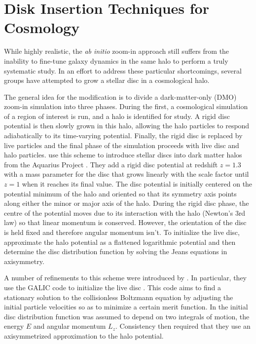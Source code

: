 \section{Disk Insertion Techniques for Cosmology}

While highly realistic, the \textit{ab initio} zoom-in approach still suffers from the inability to fine-tune galaxy dynamics in the same halo to perform a truly systematic study. In an effort to address these particular shortcomings, several groups have attempted to grow a stellar disc in a cosmological halo.  


The general idea for the modification is to divide a dark-matter-only (DMO) zoom-in simulation into three phases.  During the first, a cosmological simulation of a region of interest is run, and a halo is identified for study.  A rigid disc potential is then slowly grown in this halo, allowing the halo particles to respond adiabatically to its time-varying potential.  Finally, the rigid disc is replaced by live particles and the final phase of the simulation proceeds with live disc and halo particles.  \citet{debuhr_2012} use this scheme to introduce stellar discs into dark matter halos from the Aquarius Project \citep{springel2008}.  They add a rigid disc potential at redshift $z=1.3$ with a mass parameter for the disc that grows linearly with the scale factor until $z=1$ when it reaches its final value.  The disc potential is initially centered on the potential minimum of the halo and oriented so that its symmetry axis points along either the minor or major axis of the halo.  During the rigid disc phase, the centre of the potential moves due to its interaction with the halo (Newton's 3rd law) so that linear momentum is conserved.  However, the orientation of the disc is held fixed and therefore angular momentum isn't.  To initialize the live disc, \citet{debuhr_2012} approximate the halo potential as a flattened logarithmic potential and then determine the disc distribution function by solving the Jeans equations in axisymmetry. 

A number of refinements to this scheme were introduced by \citet{ys_2015}.  In particular, they use the GALIC code to initialize the live disc \citet{YurinSpringelGalic}.  This code aims to find a stationary solution to the collisionless Boltzmann equation by adjusting the initial particle velocities so as to minimize a certain merit function.  In \citet{ys_2015} the initial disc distribution function was assumed to depend on two integrals of motion, the energy $E$ and angular momentum $L_z$.  Consistency then required that they use an axisymmetrized approximation to the halo potential.

